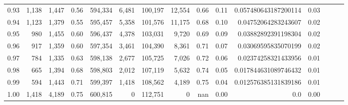 \begin{tabular}{rrrrrrrrrrrrrrr}
0.93 &   1,138 &  1,447 &  0.56 &  594,334 &    6,481 &  100,197 &   12,554 &  0.66 &  0.11 &  0.057480643187200114 &      0.03 \\
0.94 &   1,123 &  1,379 &  0.55 &  595,457 &    5,358 &  101,576 &   11,175 &  0.68 &  0.10 &   0.04752064283243607 &      0.02 \\
0.95 &     980 &  1,455 &  0.60 &  596,437 &    4,378 &  103,031 &    9,720 &  0.69 &  0.09 &   0.03882892391198304 &      0.02 \\
0.96 &     917 &  1,359 &  0.60 &  597,354 &    3,461 &  104,390 &    8,361 &  0.71 &  0.07 &   0.03069595835070199 &      0.02 \\
0.97 &     784 &  1,335 &  0.63 &  598,138 &    2,677 &  105,725 &    7,026 &  0.72 &  0.06 &   0.02374258321433956 &      0.01 \\
0.98 &     665 &  1,394 &  0.68 &  598,803 &    2,012 &  107,119 &    5,632 &  0.74 &  0.05 &  0.017844631089746432 &      0.01 \\
0.99 &     594 &  1,443 &  0.71 &  599,397 &    1,418 &  108,562 &    4,189 &  0.75 &  0.04 &  0.012576385131839186 &      0.01 \\
1.00 &   1,418 &  4,189 &  0.75 &  600,815 &        0 &  112,751 &        0 &   nan &  0.00 &                   0.0 &      0.00 \\
\bottomrule
\end{tabular}

